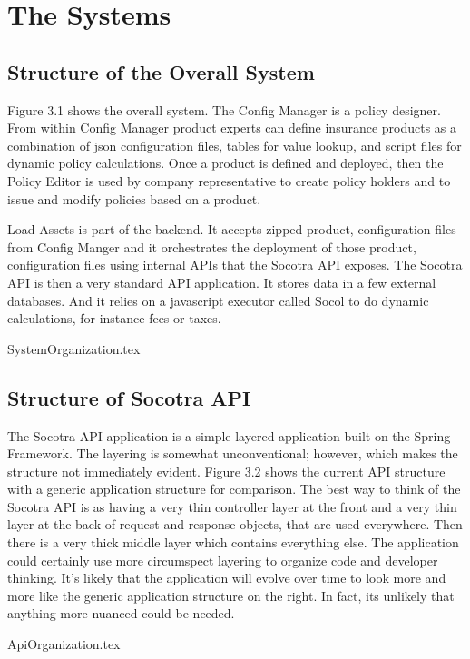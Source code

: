 
\chapter{The Systems}
\label{intro03} %


\section{Structure of the Overall System}
\label{sec:03:1}

Figure 3.1 shows the overall system. The Config Manager is a policy designer. From within Config
Manager product experts can define insurance products as a combination of json configuration
files, tables for value lookup, and script files for dynamic policy calculations. Once a product
is defined and deployed, then the Policy Editor is used by company representative to create
policy holders and to issue and modify policies based on a product.

Load Assets is part of the backend. It accepts zipped product, configuration files from Config Manger and
it orchestrates the deployment of those product, configuration files using internal APIs that the
Socotra API exposes. The Socotra API is then a very standard API application. It stores data in
a few external databases. And it relies on a javascript executor called Socol to do dynamic calculations,
for instance fees or taxes.

{SystemOrganization.tex}

\section{Structure of Socotra API}
The Socotra API application is a simple layered application built on the Spring Framework. The
layering is somewhat unconventional; however, which makes the structure not immediately evident.
Figure 3.2 shows the current API structure with a generic application structure for comparison. The
best way to think of the Socotra API is as having a very thin controller layer at the front and a
very thin layer at the back of request and response objects, that are used everywhere. Then
there is a very thick middle layer which contains everything else. The application could certainly use
more circumspect layering to organize code and developer thinking. It's likely that the application
will evolve over time to look more and more like the generic application structure on the right.
In fact, its unlikely that anything more nuanced could be needed.

{ApiOrganization.tex}


